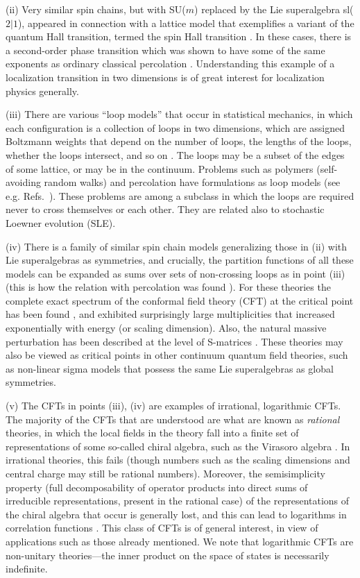 \documentclass[twocolumn,floats,pra]{revtex4}
\begin{document}
(ii) Very similar spin chains, but with SU($m$) replaced by the
Lie superalgebra sl($2|1$), appeared in connection with a lattice
model that exemplifies a variant of the quantum Hall transition,
termed the spin Hall transition \cite{glr}. In these cases, there
is a second-order phase transition which was shown to have some of
the same exponents as ordinary classical percolation \cite{glr}.
Understanding this example of a localization transition in two
dimensions is of great interest for localization physics
generally.

(iii) There are various ``loop models'' that occur in statistical
mechanics, in which each configuration is a collection of loops in
two dimensions, which are assigned Boltzmann weights that depend
on the number of loops, the lengths of the loops, whether the
loops intersect, and so on \cite{nien}. The loops may be a subset
of the edges of some lattice, or may be in the continuum. Problems
such as polymers (self-avoiding random walks) and percolation have
formulations as loop models (see e.g. Refs.\
\cite{dfsz,baxter,nienrev}). These problems are among a subclass
in which the loops are required never to cross themselves or each
other. They are related also to stochastic Loewner evolution
(SLE).

(iv) There is a family of similar spin chain models generalizing
those in (ii) with Lie superalgebras as symmetries, and crucially,
the partition functions of all these models can be expanded as
sums over sets of non-crossing loops as in point (iii) (this is
how the relation with percolation was found
\cite{bb,affleck3,glr}). For these theories the complete exact
spectrum of the conformal field theory (CFT) at the critical point
has been found \cite{rs}, and exhibited surprisingly large
multiplicities that increased exponentially with energy (or
scaling dimension). Also, the natural massive perturbation has
been described at the level of S-matrices \cite{fr}. These
theories may also be viewed as critical points in other continuum
quantum field theories, such as non-linear sigma models that
possess the same Lie superalgebras as global symmetries.

(v) The CFTs in points (iii), (iv) are examples of irrational,
logarithmic CFTs. The majority of the CFTs that are understood are
what are known as {\em rational} theories, in which the local
fields in the theory fall into a finite set of representations of
some so-called chiral algebra, such as the Virasoro algebra
\cite{cft}. In irrational theories, this fails (though numbers
such as the scaling dimensions and central charge may still be
rational numbers). Moreover, the semisimplicity property (full
decomposability of operator products into direct sums of
irreducible representations, present in the rational case) of the
representations of the chiral algebra that occur is generally
lost, and this can lead to logarithms in correlation functions
\cite{gurarie}. This class of CFTs is of general interest, in view
of applications such as those already mentioned. We note that
logarithmic CFTs are non-unitary theories---the inner product on
the space of states is necessarily indefinite.
\end{document}
